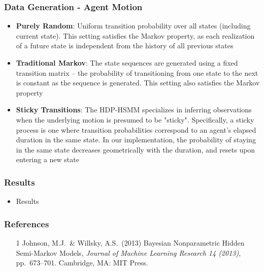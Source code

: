 \documentclass{beamer}
\begin{document}
\begin{frame}
    \frametitle{Data Generation - Agent Motion}
    \begin{itemize}
    \item \textbf{Purely Random}: Uniform transition probability over all states (including current state). This setting satisfies the Markov property, as each realization of a future state is independent from the history of all previous states
    \item \textbf{Traditional Markov}: The state sequences are generated using a fixed transition matrix -- the probability of transitioning from one state to the next is constant as the sequence is generated. This setting also satisfies the Markov property
    \item \textbf{Sticky Transitions}: The HDP-HSMM specializes in inferring observations when the underlying motion is presumed to be "sticky". Specifically, a sticky process is one where transition probabilities correspond to an agent's elapsed duration in the same state. In our implementation, the probability of staying in the same state decreases geometrically with the duration, and resets upon entering a new state
    \end{itemize}
\end{frame}

\begin{frame}
    \frametitle{Results}
    \begin{itemize}
        \item Results
    \end{itemize}
\end{frame}


\begin{frame}
    \frametitle{References}
    \begin{itemize}
        \item [1] Johnson, M.J.\ \& Willsky, A.S.\ (2013) Bayesian Nonparametric Hidden Semi-Markov Models, {\it Journal of Machine Learning Research 14 (2013)},
        pp.\ 673--701. Cambridge, MA: MIT Press.
    \end{itemize}
\end{frame}
\end{document}
